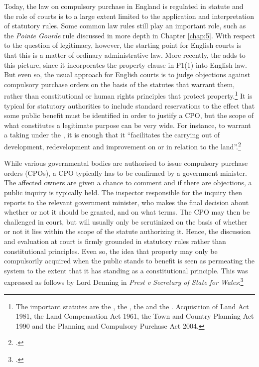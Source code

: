 Today, the law on compulsory purchase in England is regulated in statute and the role of courts is to a large extent limited to the application and interpretation of statutory rules. Some common law rules still play an important role, such as the {\it Pointe Gourde} rule discussed in more depth in Chapter \ref{chap:5}. With respect to the question of legitimacy, however, the starting point for English courts is that this is a matter of ordinary administrative law. More recently, the \cite{hra98} adds to this picture, since it incorporates the property clause in P1(1) into English law. But even so, the usual approach for English courts is to judge objections against compulsory purchase orders on the basis of the statutes that warrant them, rather than constitutional or human rights principles that protect property.\footnote{The important statutes are the \cite{ala81}, the \cite{lca61}, the \cite{tcpa90} and the \cite{pcpa04}. Acquisition of Land Act 1981, the Land Compensation Act 1961, the Town and Country Planning Act 1990 and the Planning and Compulsory Purchase Act 2004.} It is typical for statutory authorities to include standard reservations to the effect that some public benefit must be identified in order to justify a CPO, but the scope of what constitutes a legitimate purpose can be very wide. For instance, to warrant a taking under the \cite{tcpa90}, it is enough that it ``facilitates the carrying out of development, redevelopment and improvement on or in relation to the land''.\footcite[226]{tcpa90} 

While various governmental bodies are authorised to issue compulsory purchase orders (CPOs), a CPO typically has to be confirmed by a government minister. The affected owners are given a chance to comment and if there are objections, a public inquiry is typically held. The inspector responsible for the inquiry then reports to the relevant government minister, who makes the final decision about whether or not it should be granted, and on what terms. The CPO may then be challenged in court, but will usually only be scrutinized on the basis of whether or not it lies within the scope of the statute authorizing it. Hence, the discussion and evaluation at court is firmly grounded in statutory rules rather than constitutional principles. Even so, the idea that property may only be compulsorily acquired when the public stands to benefit is seen as permeating the system to the extent that it has standing as a constitutional principle. This was expressed as follows by Lord Denning in {\it Prest v Secretary of State for Wales}:\footcite{prest82}

